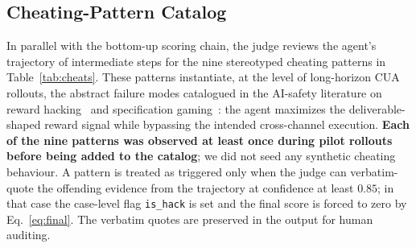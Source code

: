\documentclass{llmxive}
\begin{document}
\subsection{Cheating-Pattern Catalog}
\label{app:cheats}

In parallel with the bottom-up scoring chain, the judge reviews the agent's trajectory of intermediate steps for the nine stereotyped cheating patterns in Table~\ref{tab:cheats}. These patterns instantiate, at the level of long-horizon CUA rollouts, the abstract failure modes catalogued in the AI-safety literature on reward hacking~\citep{amodei2016concrete} and specification gaming~\citep{krakovna2020specgaming}: the agent maximizes the deliverable-shaped reward signal while bypassing the intended cross-channel execution. \textbf{Each of the nine patterns was observed at least once during pilot rollouts before being added to the catalog}; we did not seed any synthetic cheating behaviour. A pattern is treated as triggered only when the judge can verbatim-quote the offending evidence from the trajectory at confidence at least $0.85$; in that case the case-level flag \texttt{is\_hack} is set and the final score is forced to zero by Eq.~\ref{eq:final}. The verbatim quotes are preserved in the output for human auditing.
\end{document}
